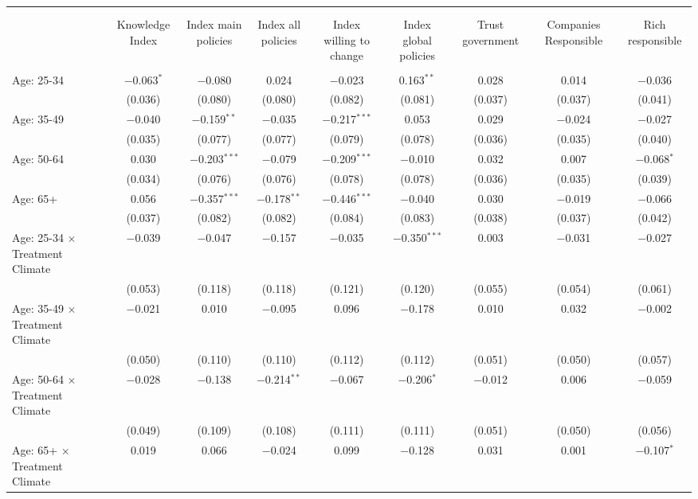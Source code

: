 
\begin{tabular}{@{\extracolsep{5pt}}lcccccccc} 
\\[-1.8ex]\hline 
\hline \\[-1.8ex] 
\\[-1.8ex] & Knowledge Index & Index main policies & Index all policies & Index willing to change & Index global policies & Trust government & Companies Responsible & Rich responsible \\ 
\hline \\[-1.8ex] 
 Age: 25-34 & $-$0.063$^{*}$ & $-$0.080 & 0.024 & $-$0.023 & 0.163$^{**}$ & 0.028 & 0.014 & $-$0.036 \\ 
  & (0.036) & (0.080) & (0.080) & (0.082) & (0.081) & (0.037) & (0.037) & (0.041) \\ 
 Age: 35-49 & $-$0.040 & $-$0.159$^{**}$ & $-$0.035 & $-$0.217$^{***}$ & 0.053 & 0.029 & $-$0.024 & $-$0.027 \\ 
  & (0.035) & (0.077) & (0.077) & (0.079) & (0.078) & (0.036) & (0.035) & (0.040) \\ 
 Age: 50-64 & 0.030 & $-$0.203$^{***}$ & $-$0.079 & $-$0.209$^{***}$ & $-$0.010 & 0.032 & 0.007 & $-$0.068$^{*}$ \\ 
  & (0.034) & (0.076) & (0.076) & (0.078) & (0.078) & (0.036) & (0.035) & (0.039) \\ 
 Age: 65+ & 0.056 & $-$0.357$^{***}$ & $-$0.178$^{**}$ & $-$0.446$^{***}$ & $-$0.040 & 0.030 & $-$0.019 & $-$0.066 \\ 
  & (0.037) & (0.082) & (0.082) & (0.084) & (0.083) & (0.038) & (0.037) & (0.042) \\ 
 Age: 25-34 $\times$ Treatment Climate & $-$0.039 & $-$0.047 & $-$0.157 & $-$0.035 & $-$0.350$^{***}$ & 0.003 & $-$0.031 & $-$0.027 \\ 
  & (0.053) & (0.118) & (0.118) & (0.121) & (0.120) & (0.055) & (0.054) & (0.061) \\ 
 Age: 35-49 $\times$ Treatment Climate & $-$0.021 & 0.010 & $-$0.095 & 0.096 & $-$0.178 & 0.010 & 0.032 & $-$0.002 \\ 
  & (0.050) & (0.110) & (0.110) & (0.112) & (0.112) & (0.051) & (0.050) & (0.057) \\ 
 Age: 50-64 $\times$ Treatment Climate & $-$0.028 & $-$0.138 & $-$0.214$^{**}$ & $-$0.067 & $-$0.206$^{*}$ & $-$0.012 & 0.006 & $-$0.059 \\ 
  & (0.049) & (0.109) & (0.108) & (0.111) & (0.111) & (0.051) & (0.050) & (0.056) \\ 
 Age: 65+ $\times$ Treatment Climate & 0.019 & 0.066 & $-$0.024 & 0.099 & $-$0.128 & 0.031 & 0.001 & $-$0.107$^{*}$ \\ 

\end{tabular}
